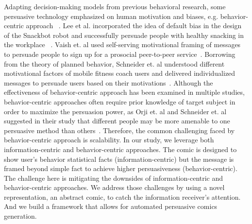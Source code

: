 Adapting decision-making models from previous behavioral research, some persuasive technology emphasized on human motivation and biases, e.g. behavior-centric approach ~\cite{LeeKF11}. Lee et al. incorporated the idea of default bias in the design of the Snackbot robot and successfully persuade people with healthy snacking in the workplace ~\cite{LeeKF11}. Vaish et. al used self-serving motivational framing of messages to persuade people to sign up for a prosocial peer-to-peer service~\cite{vaish2018s}. Borrowing from the theory of planned behavior, Schneider et. al understood different motivational factors of mobile fitness coach users and delivered individualized messages to persuade users based on their motivations~\cite{schneider2016understanding}. Although the effectiveness of behavior-centric approach has been examined in multiple studies, behavior-centric approaches often require prior knowledge of target subject in order to maximize the persuasion power, as Orji et. al and Schneider et. al suggested in their study that different people may be more amenable to one persuasive method than others~\cite{schneider2016understanding,orji2014developing}. Therefore, the common challenging faced by behavior-centric approach is scalability. In our study, we leverage both information-centric and behavior-centric approaches. The comic is designed to show user's behavior statistical facts (information-centric) but the message is framed beyond simple fact to achieve higher persuasiveness (behavior-centric). The challenge here is mitigating the downsides of information-centric and behavior-centric approaches. We address those challenges by using a novel representation, an abstract comic, to catch the information receiver's attention. And we build a framework that allows for  automated persuasive comics generation.

